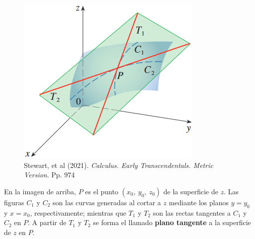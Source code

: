 \documentclass[12pt]{article}
\begin{document}
\begin{figure}[hbt!]
\centering
\includegraphics[scale=0.48]{plano-tangente.png}
\caption{Stewart, et al (2021). \textit{Calculus. Early Transcendentals. Metric Version}. Pp. 974}
\end{figure}

En la imagen de arriba, $P$ es el punto $(x_{0}, \ y_{0}, \ z_{0})$ de la superficie de $z$. Las figuras $C_{1}$ y $C_{2}$ son las curvas generadas al cortar a $z$ mediante los planos $y = y_{0}$ y $x = x_{0}$, respectivamente; mientras que $T_{1}$ y $T_{2}$ son las rectas tangentes a $C_{1}$ y $C_{2}$ en $P$. A partir de $T_{1}$ y $T_{2}$ se forma el llamado \textbf{plano tangente} a la superficie de $z$ en $P$.
\end{document}
